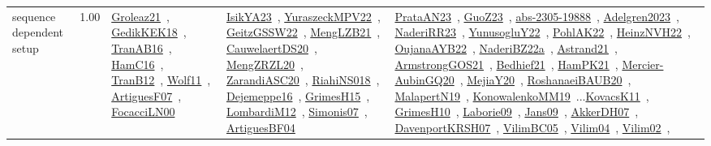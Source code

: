 {\begin{longtable}{p{3cm}r>{\raggedright\arraybackslash}p{6cm}>{\raggedright\arraybackslash}p{6cm}>{\raggedright\arraybackslash}p{8cm}}
\index{sequence dependent setup}\index{Concepts!sequence dependent setup}sequence dependent setup &  1.00 & \href{../works/Groleaz21.pdf}{Groleaz21}~\cite{Groleaz21}, \href{../works/GedikKEK18.pdf}{GedikKEK18}~\cite{GedikKEK18}, \href{../works/TranAB16.pdf}{TranAB16}~\cite{TranAB16}, \href{../works/HamC16.pdf}{HamC16}~\cite{HamC16}, \href{../works/TranB12.pdf}{TranB12}~\cite{TranB12}, \href{../works/Wolf11.pdf}{Wolf11}~\cite{Wolf11}, \href{../works/ArtiguesF07.pdf}{ArtiguesF07}~\cite{ArtiguesF07}, \href{../works/FocacciLN00.pdf}{FocacciLN00}~\cite{FocacciLN00} & \href{../works/IsikYA23.pdf}{IsikYA23}~\cite{IsikYA23}, \href{../works/YuraszeckMPV22.pdf}{YuraszeckMPV22}~\cite{YuraszeckMPV22}, \href{../works/GeitzGSSW22.pdf}{GeitzGSSW22}~\cite{GeitzGSSW22}, \href{../works/MengLZB21.pdf}{MengLZB21}~\cite{MengLZB21}, \href{../works/CauwelaertDS20.pdf}{CauwelaertDS20}~\cite{CauwelaertDS20}, \href{../works/MengZRZL20.pdf}{MengZRZL20}~\cite{MengZRZL20}, \href{../works/ZarandiASC20.pdf}{ZarandiASC20}~\cite{ZarandiASC20}, \href{../works/RiahiNS018.pdf}{RiahiNS018}~\cite{RiahiNS018}, \href{../works/Dejemeppe16.pdf}{Dejemeppe16}~\cite{Dejemeppe16}, \href{../works/GrimesH15.pdf}{GrimesH15}~\cite{GrimesH15}, \href{../works/LombardiM12.pdf}{LombardiM12}~\cite{LombardiM12}, \href{../works/Simonis07.pdf}{Simonis07}~\cite{Simonis07}, \href{../works/ArtiguesBF04.pdf}{ArtiguesBF04}~\cite{ArtiguesBF04} & \href{../works/PrataAN23.pdf}{PrataAN23}~\cite{PrataAN23}, \href{../works/GuoZ23.pdf}{GuoZ23}~\cite{GuoZ23}, \href{../works/abs-2305-19888.pdf}{abs-2305-19888}~\cite{abs-2305-19888}, \href{../works/Adelgren2023.pdf}{Adelgren2023}~\cite{Adelgren2023}, \href{../works/NaderiRR23.pdf}{NaderiRR23}~\cite{NaderiRR23}, \href{../works/YunusogluY22.pdf}{YunusogluY22}~\cite{YunusogluY22}, \href{../works/PohlAK22.pdf}{PohlAK22}~\cite{PohlAK22}, \href{../works/HeinzNVH22.pdf}{HeinzNVH22}~\cite{HeinzNVH22}, \href{../works/OujanaAYB22.pdf}{OujanaAYB22}~\cite{OujanaAYB22}, \href{../works/NaderiBZ22a.pdf}{NaderiBZ22a}~\cite{NaderiBZ22a}, \href{../works/Astrand21.pdf}{Astrand21}~\cite{Astrand21}, \href{../works/ArmstrongGOS21.pdf}{ArmstrongGOS21}~\cite{ArmstrongGOS21}, \href{../works/Bedhief21.pdf}{Bedhief21}~\cite{Bedhief21}, \href{../works/HamPK21.pdf}{HamPK21}~\cite{HamPK21}, \href{../works/Mercier-AubinGQ20.pdf}{Mercier-AubinGQ20}~\cite{Mercier-AubinGQ20}, \href{../works/MejiaY20.pdf}{MejiaY20}~\cite{MejiaY20}, \href{../works/RoshanaeiBAUB20.pdf}{RoshanaeiBAUB20}~\cite{RoshanaeiBAUB20}, \href{../works/MalapertN19.pdf}{MalapertN19}~\cite{MalapertN19}, \href{../works/KonowalenkoMM19.pdf}{KonowalenkoMM19}~\cite{KonowalenkoMM19}...\href{../works/KovacsK11.pdf}{KovacsK11}~\cite{KovacsK11}, \href{../works/GrimesH10.pdf}{GrimesH10}~\cite{GrimesH10}, \href{../works/Laborie09.pdf}{Laborie09}~\cite{Laborie09}, \href{../works/Jans09.pdf}{Jans09}~\cite{Jans09}, \href{../works/AkkerDH07.pdf}{AkkerDH07}~\cite{AkkerDH07}, \href{../works/DavenportKRSH07.pdf}{DavenportKRSH07}~\cite{DavenportKRSH07}, \href{../works/VilimBC05.pdf}{VilimBC05}~\cite{VilimBC05}, \href{../works/Vilim04.pdf}{Vilim04}~\cite{Vilim04}, \href{../works/Vilim02.pdf}{Vilim02}~\cite{Vilim02}, 
\end{longtable}}
